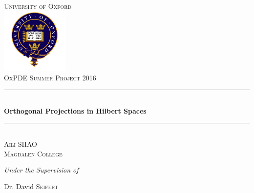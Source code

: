 \documentclass[12pt, a4paper]{book}
\numberwithin{equation}{section}
\newtheorem{proposition and definition}[theorem]{Proposition and Definition}
\numberwithin{equation}{section}
\begin{document}
\frontmatter
\begin{titlepage}
\begin{center}
\textsc{\LARGE University of Oxford}\\[1.5cm]
\includegraphics[width=0.25\textwidth]{ox}\\[1cm]
\textsc{\Large OxPDE Summer Project 2016}\\[0.5cm]
\newcommand{\HRule}{\rule{\linewidth}{0.5mm}}
\HRule \\[0.4cm]
{ \huge \bfseries Orthogonal Projections in Hilbert Spaces}\\[0.4cm]
\HRule \\[1.5cm]
\textsc{\Large Aili SHAO} \\
\textsc{\Large Magdalen College}
\vfill
\begin{center} {\large
\emph{Under the Supervision of}}\\
\end{center}
\begin{center}{\large 
Dr. David \textsc{Seifert}}
\end{center}
\end{center}
\end{titlepage}
\newpage


\tableofcontents 
\newpage
\mainmatter
















\end{document}
